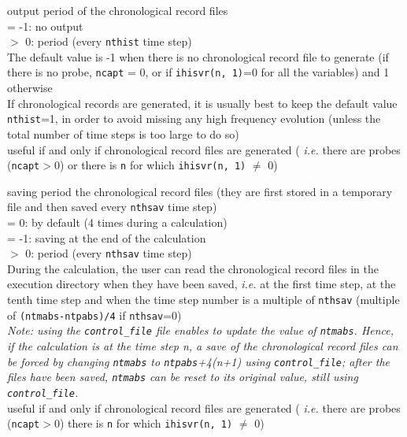 {output period of the chronological record files\\
\hspace*{1.3cm}= -1: no output\\
\hspace*{1.3cm}$>$ 0: period  (every {\tt nthist} time step)\\
The default value is -1 when there is no chronological record file to
generate (if there is no probe, {\tt ncapt} = 0, or if {\tt ihisvr(n, 1)}=0 for
all the variables) and 1 otherwise\\
If chronological records are generated, it is usually best to keep the default
value {\tt nthist}=1, in order to avoid missing any high frequency evolution (unless
the total number of time steps is too large to do so)\\
useful if and only if chronological record files are generated ({\em
i.e.} there are probes ({\tt ncapt}$>$0) or  there is {\tt n} for which
{\tt ihisvr(n, 1)} $\ne$ 0)}

{saving period the chronological record files (they are first stored in a
temporary file and then saved every {\tt nthsav} time step)\\
\hspace*{1.3cm}= 0: by default (4 times during a calculation)\\
\hspace*{1.3cm}= -1: saving at the end of the calculation\\
\hspace*{1.3cm}$>$ 0: period (every {\tt nthsav} time step)\\
During the calculation, the user can read the chronological record files
in the execution directory when they have been saved, {\em i.e.} at the first
time step, at the tenth time step and when the time step number is a multiple of
{\tt nthsav} (multiple of {\tt (ntmabs-ntpabs)/4} if {\tt nthsav}=0)\\
{\em Note: using the \texttt{control\_file} file enables to update the value of
{\tt ntmabs}. Hence, if the calculation is at the time step n, a save of the
chronological record files can be forced by changing {\tt ntmabs} to
{\tt ntpabs}+4(n+1)
using \texttt{control\_file}; after the files have been saved, {\tt ntmabs} can be
reset to its original value, still using \texttt{control\_file}.}\\
useful if and only if chronological record files are generated ({\em
i.e.} there are probes ({\tt ncapt}$>$0) there is {\tt n} for which
{\tt ihisvr(n, 1)} $\ne$ 0)}

